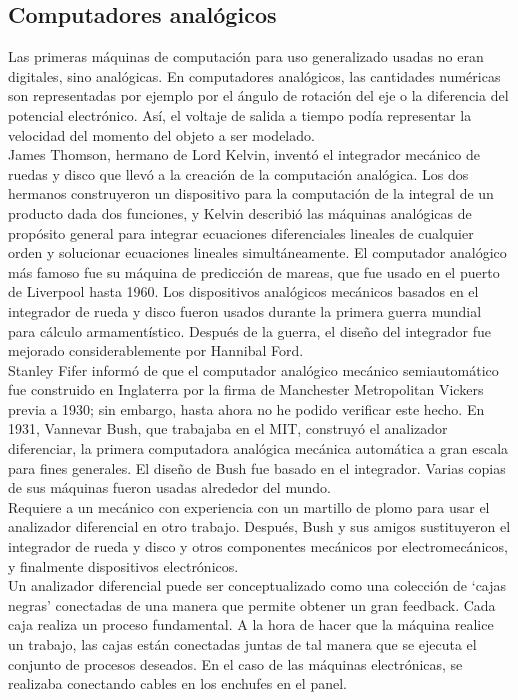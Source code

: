 \documentclass[a4paper]{article}
\begin{document}
    \subsection*{Computadores analógicos}

    Las primeras máquinas de computación para uso generalizado usadas no eran digitales, sino analógicas. En computadores analógicos, las cantidades numéricas son representadas por ejemplo por el ángulo de rotación del eje o la diferencia del potencial electrónico. Así, el voltaje de salida a tiempo podía representar la velocidad del momento del objeto a ser modelado.\\

    James Thomson, hermano de Lord Kelvin, inventó el integrador  mecánico de ruedas y disco que llevó a la creación de la computación analógica. Los dos hermanos construyeron un dispositivo para la computación de la integral de un producto dada dos funciones, y Kelvin describió las máquinas analógicas de propósito general para integrar ecuaciones diferenciales lineales de cualquier orden y solucionar ecuaciones lineales simultáneamente. El computador analógico más famoso fue su máquina de predicción de mareas, que fue usado en el puerto de Liverpool hasta 1960. Los dispositivos analógicos mecánicos basados en el integrador de rueda y disco fueron usados durante la primera guerra mundial para cálculo armamentístico. Después de la guerra, el diseño del integrador fue mejorado considerablemente por Hannibal Ford.\\

    Stanley Fifer informó de que el computador analógico mecánico semiautomático fue construido en Inglaterra por la firma de Manchester Metropolitan Vickers  previa a 1930; sin embargo,  hasta ahora no he podido verificar este hecho. En 1931, Vannevar Bush, que trabajaba en el MIT, construyó el analizador diferenciar, la primera  computadora analógica mecánica automática a gran escala para fines generales. El diseño de Bush fue basado en el integrador. Varias copias de sus máquinas fueron usadas alrededor del mundo.\\

    Requiere a un mecánico con experiencia con un martillo de plomo para usar el analizador diferencial en otro trabajo. Después, Bush y sus amigos sustituyeron el integrador de rueda y disco y otros componentes mecánicos por electromecánicos, y finalmente dispositivos electrónicos.\\

    Un analizador diferencial puede ser conceptualizado como una colección de ‘cajas negras’ conectadas de una manera que permite obtener un gran feedback. Cada caja realiza un proceso fundamental. A la hora de hacer que la máquina realice un trabajo, las cajas están conectadas juntas de tal manera que se ejecuta el conjunto de procesos deseados. En el caso de las máquinas electrónicas, se realizaba conectando cables en los enchufes en el panel.\\
\end{document}
